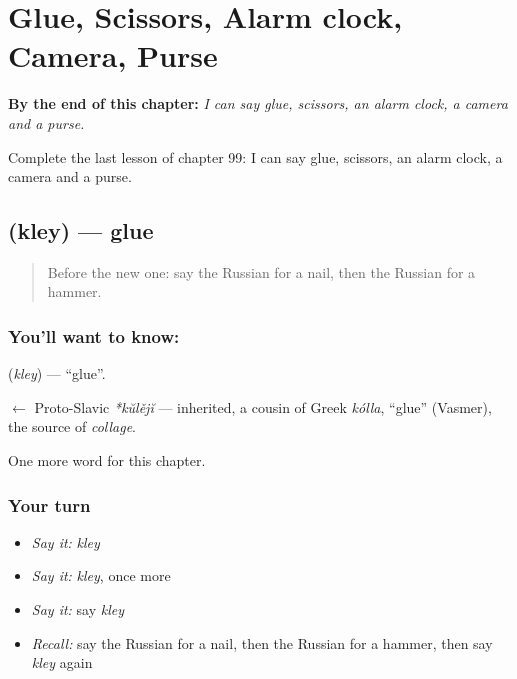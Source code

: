 
\chapter{Glue, Scissors, Alarm clock, Camera, Purse}
\label{ch:ru-glue-scissors-alarm-clock-camera-purse}

\begin{chapteropening}
\textbf{By the end of this chapter:} \emph{I can say glue, scissors, an alarm clock, a camera and a purse.}

Complete the last lesson of chapter 99: I can say glue, scissors, an alarm clock, a camera and a purse.
\end{chapteropening}

\section[\texorpdfstring{\ru{клей} (kley)}{клей (kley)}]{ (kley) — glue}

\label{lesson:RU-C99-glue}



\begin{quote}
Before the new one: say the Russian for a nail, then the Russian for a hammer.
\end{quote}

\subsection*{You'll want to know: }
\textbf{} (\emph{kley}) — \textquotedblleft{}glue\textquotedblright{}.

\begin{cousinweb}
\textbf{} $\leftarrow$ Proto-Slavic \emph{*kŭlějĭ} — inherited, a cousin of Greek \emph{kólla}, \textquotedblleft{}glue\textquotedblright{} (Vasmer), the source of \emph{collage}.
\end{cousinweb}

\begin{grammarlens}[title={What you've built}]
One more word for this chapter.
\end{grammarlens}

\subsection*{Your turn}
\begin{itemize}
\raggedright
  \item \emph{Say it:} \emph{kley}
  \item \emph{Say it:} \emph{kley}, once more
  \item \emph{Say it:} say \emph{kley}
  \item \emph{Recall:} say the Russian for a nail, then the Russian for a hammer, then say \emph{kley} again
\end{itemize}


